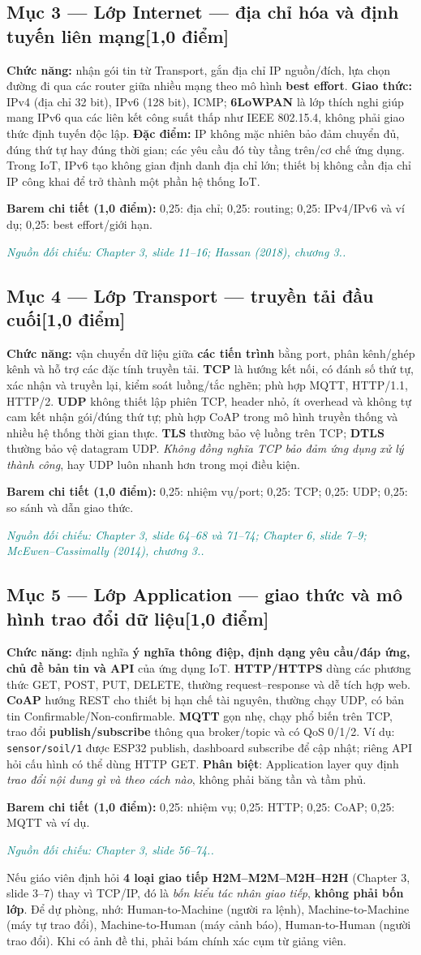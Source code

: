\documentclass[11pt,a4paper]{article}
\newcommand{\pointpart}[2]{\subsection*{Mục #1 --- #2\hfill\normalsize\color{teal}[1,0 điểm]}}
\newcommand{\src}[1]{\par\noindent\textcolor{teal}{\footnotesize\textit{Nguồn đối chiếu: #1.}}\par}
\newcommand{\scoring}[1]{\par\noindent\textbf{Barem chi tiết (1,0 điểm):} #1\par}
\newcommand{\kw}[1]{\textbf{#1}}
\begin{document}
\pointpart{3}{Lớp Internet --- địa chỉ hóa và định tuyến liên mạng}
\kw{Chức năng:} nhận gói tin từ Transport, gắn địa chỉ IP nguồn/đích, lựa chọn đường đi qua các router giữa nhiều mạng theo mô hình \kw{best effort}. \kw{Giao thức:} IPv4 (địa chỉ 32 bit), IPv6 (128 bit), ICMP; \kw{6LoWPAN} là lớp thích nghi giúp mang IPv6 qua các liên kết công suất thấp như IEEE 802.15.4, không phải giao thức định tuyến độc lập. \kw{Đặc điểm:} IP không mặc nhiên bảo đảm chuyển đủ, đúng thứ tự hay đúng thời gian; các yêu cầu đó tùy tầng trên/cơ chế ứng dụng. Trong IoT, IPv6 tạo không gian định danh địa chỉ lớn; thiết bị không cần địa chỉ IP công khai để trở thành một phần hệ thống IoT.
\scoring{0,25: địa chỉ; 0,25: routing; 0,25: IPv4/IPv6 và ví dụ; 0,25: best effort/giới hạn.}
\src{Chapter 3, slide 11--16; Hassan (2018), chương 3.}

\pointpart{4}{Lớp Transport --- truyền tải đầu cuối}
\kw{Chức năng:} vận chuyển dữ liệu giữa \kw{các tiến trình} bằng port, phân kênh/ghép kênh và hỗ trợ các đặc tính truyền tải. \kw{TCP} là hướng kết nối, có đánh số thứ tự, xác nhận và truyền lại, kiểm soát luồng/tắc nghẽn; phù hợp MQTT, HTTP/1.1, HTTP/2. \kw{UDP} không thiết lập phiên TCP, header nhỏ, ít overhead và không tự cam kết nhận gói/đúng thứ tự; phù hợp CoAP trong mô hình truyền thống và nhiều hệ thống thời gian thực. \kw{TLS} thường bảo vệ luồng trên TCP; \kw{DTLS} thường bảo vệ datagram UDP. \emph{Không đồng nghĩa TCP bảo đảm ứng dụng xử lý thành công}, hay UDP luôn nhanh hơn trong mọi điều kiện.
\scoring{0,25: nhiệm vụ/port; 0,25: TCP; 0,25: UDP; 0,25: so sánh và dẫn giao thức.}
\src{Chapter 3, slide 64--68 và 71--74; Chapter 6, slide 7--9; McEwen--Cassimally (2014), chương 3.}

\pointpart{5}{Lớp Application --- giao thức và mô hình trao đổi dữ liệu}
\kw{Chức năng:} định nghĩa \kw{ý nghĩa thông điệp, định dạng yêu cầu/đáp ứng, chủ đề bản tin và API} của ứng dụng IoT. \kw{HTTP/HTTPS} dùng các phương thức GET, POST, PUT, DELETE, thường request--response và dễ tích hợp web. \kw{CoAP} hướng REST cho thiết bị hạn chế tài nguyên, thường chạy UDP, có bản tin Confirmable/Non-confirmable. \kw{MQTT} gọn nhẹ, chạy phổ biến trên TCP, trao đổi \kw{publish/subscribe} thông qua broker/topic và có QoS 0/1/2. Ví dụ: \texttt{sensor/soil/1} được ESP32 publish, dashboard subscribe để cập nhật; riêng API hỏi cấu hình có thể dùng HTTP GET. \kw{Phân biệt}: Application layer quy định \emph{trao đổi nội dung gì và theo cách nào}, không phải băng tần và tầm phủ.
\scoring{0,25: nhiệm vụ; 0,25: HTTP; 0,25: CoAP; 0,25: MQTT và ví dụ.}
\src{Chapter 3, slide 56--74.}
\begin{warningbox}Nếu giáo viên định hỏi \textbf{4 loại giao tiếp H2M--M2M--M2H--H2H} (Chapter 3, slide 3--7) thay vì TCP/IP, đó là \emph{bốn kiểu tác nhân giao tiếp}, \textbf{không phải bốn lớp}. Để dự phòng, nhớ: Human-to-Machine (người ra lệnh), Machine-to-Machine (máy tự trao đổi), Machine-to-Human (máy cảnh báo), Human-to-Human (người trao đổi). Khi có ảnh đề thi, phải bám chính xác cụm từ giảng viên.\end{warningbox}
\end{document}
